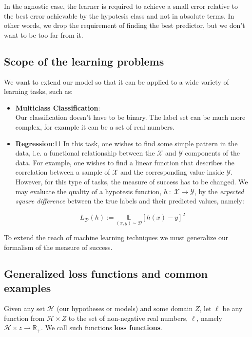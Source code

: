 \documentclass[../../main/main.tex]{subfiles}
\begin{document}
In the agnostic case, the learner is required to achieve a small error relative to the best error achievable by the hypotesis class and not in absolute terms. In other words, we drop the requirement of finding the best predictor, but we don't want to be too far from it.



\subsection{Scope of the learning problems}
We want to extend our model so that it can be applied to a wide variety of learning tasks, such as:
\begin{itemize}
    \item \textbf{Multiclass Classification}:\\
        Our classification doesn't have to be binary. The label set can be much more complex, for example it can be a set of real numbers.

    \item \textbf{Regression}:11
        In this task, one wishes to find some simple pattern in the data, i.e. a functional relationship between the \( \mathcal{X} \) and \( \mathcal{Y} \) components of the data. For example, one wishes to find a linear function that describes the correlation between a sample of \( \mathcal{X} \) and the corresponding value inside \( \mathcal{Y} \). However, for this type of tasks, the measure of success has to be changed. We may evaluate the quality of a hypotesis function, \( h \ : \ \mathcal{X} \to \mathcal{Y} \), by the \emph{expected square difference} between the true labels and their predicted values, namely:

        \begin{equation}
            L_{\mathcal{D}}(h) := \underset{(x,y) \sim \mathcal{D}}{\mathbb{E}} [h(x) - y]^2
            \label{eq:C2_ESD}
        \end{equation}
\end{itemize}

To extend the reach of machine learning techniques we must generalize our formalism of the measure of success.



\subsection{Generalized loss functions and common examples}
Given any set \( \mathcal{H} \) (our hypotheses or models) and some domain \( Z \), let \( \ell \) be any function from \( \mathcal{H} \times Z \) to the set of non-negative real numbers, \( \ell \), namely \( \mathcal{H} \times z \to \mathbb{R}_{+} \). We call such functions \textbf{loss functions}.
\end{document}
